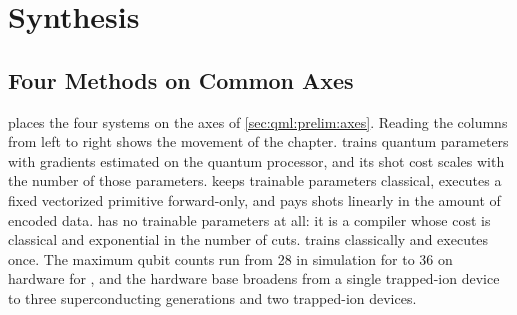 \section{Synthesis}\label{sec:qml:synthesis}

\subsection{Four Methods on Common Axes}\label{sec:qml:synthesis:axes}

 places the four systems on the axes of \cref{sec:qml:prelim:axes}. Reading the columns from left to right shows the movement of the chapter. \qpie{} trains quantum parameters with gradients estimated on the quantum processor, and its shot cost scales with the number of those parameters. \vqt{} keeps trainable parameters classical, executes a fixed vectorized primitive forward-only, and pays shots linearly in the amount of encoded data. \shardq{} has no trainable parameters at all: it is a compiler whose cost is classical and exponential in the number of cuts. \nnqa{} trains classically and executes once. The maximum qubit counts run from 28 in simulation for \qpie{} to 36 on hardware for \nnqa{}, and the hardware base broadens from a single trapped-ion device to three superconducting generations and two trapped-ion devices.

